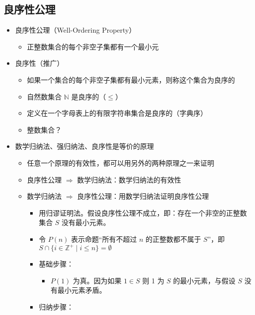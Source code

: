 \documentclass[UTF8]{report}
\theoremstyle{MyLineTheoremStyle} %
\theoremstyle{MyBlockTheoremStyle} %
\theoremstyle{MySubsubsectionStyle} %
\begin{document}
        \subsection{良序性公理}
        
        \begin{itemize}
            \item 良序性公理（Well-Ordering Property）
            \begin{itemize}
                \item 正整数集合的每个非空子集都有一个最小元
            \end{itemize}
            \item 良序性（推广）
            \begin{itemize}
                \item 如果一个集合的每个非空子集都有最小元素，则称这个集合为良序的
                \item 自然数集合 $\mathbb{N}$ 是良序的（$\leq$）
                \item 定义在一个字母表上的有限字符串集合是良序的（字典序）
                \item 整数集合？
            \end{itemize}
            \item 数学归纳法、强归纳法、良序性是等价的原理
            \begin{itemize}
                \item 任意一个原理的有效性，都可以用另外的两种原理之一来证明
                \item 良序性公理 $\Rightarrow$ 数学归纳法：数学归纳法的有效性
                \item 数学归纳法 $\Rightarrow$ 良序性公理：用数学归纳法证明良序性公理
                \begin{itemize}
                    \item 用归谬证明法。假设良序性公理不成立，即：存在一个非空的正整数集合 $S$ 没有最小元素。
                    \item 令 $P(n)$ 表示命题“所有不超过 $n$ 的正整数都不属于 $S$”，即 $S \cap \{i \in \mathbb{Z}^+ \mid i \leq n\} = \emptyset$
                    \item 基础步骤：
                    \begin{itemize}
                        \item $P(1)$ 为真。因为如果 $1 \in S$ 则 1 为 $S$ 的最小元素，与假设 $S$ 没有最小元素矛盾。
                    \end{itemize}
                    \item 归纳步骤：

\end{itemize}
\end{itemize}
\end{itemize}
\end{document}
